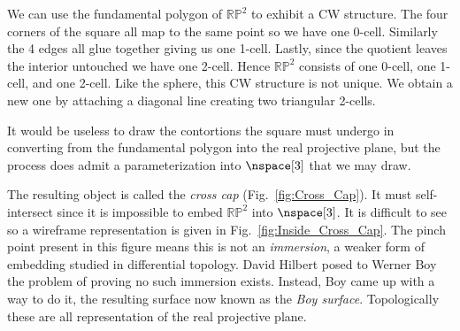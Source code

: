 \documentclass{book}                                                           %
\begin{document}
            \hfill
            \begin{minipage}[t]{0.54\textwidth}
                \begin{example}
                    We can use the fundamental polygon of $\mathbb{RP}^{2}$ to
                    exhibit a CW structure. The four corners of the square all
                    map to the same point so we have one 0-cell. Similarly the
                    4 edges all glue together giving us one 1-cell. Lastly,
                    since the quotient leaves the interior untouched we have
                    one 2-cell. Hence $\mathbb{RP}^{2}$ consists of one 0-cell,
                    one 1-cell, and one 2-cell. Like the sphere, this CW
                    structure is not unique. We obtain a new one by attaching
                    a diagonal line creating two triangular 2-cells.
                \end{example}
            \end{minipage}
            \par\vspace{2.5ex}
            It would be useless to draw the contortions the square
            must undergo in converting from the fundamental polygon into
            the real projective plane, but the process does admit a
            parameterization into $\nspace[3]$ that we may draw.
            \par\hfill\par
            \begin{minipage}[t]{0.54\textwidth}
                The resulting object is called the \textit{cross cap}
                (Fig.~\ref{fig:Cross_Cap}). It must self-intersect since it is
                impossible to embed $\mathbb{RP}^{2}$ into $\nspace[3]$. It
                is difficult to see so a wireframe representation is given in
                Fig.~\ref{fig:Inside_Cross_Cap}. The pinch point present in this
                figure means this is not an \textit{immersion}, a weaker form of
                embedding studied in differential topology. David Hilbert
                posed to Werner Boy the problem of proving no such
                immersion exists. Instead, Boy came up with a way to do it, the
                resulting surface now known as the \textit{Boy surface}.
                Topologically these are all representation of the real
                projective plane.
            \end{minipage}
            \hfill
\end{document}
